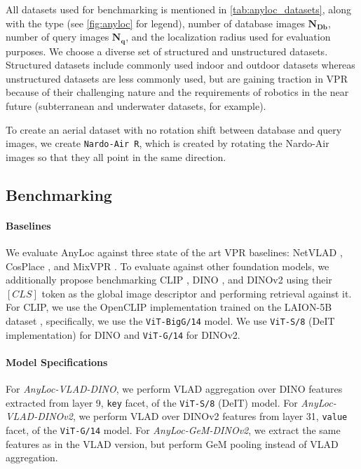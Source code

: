 All datasets used for benchmarking is mentioned in
\cref{tab:anyloc_datasets}, along with the type (see \cref{fig:anyloc}
for legend), number of database images $\mathbf{N_{Db}}$, number of
query images $\mathbf{N_q}$, and the localization radius used for
evaluation purposes. We choose a diverse set of structured and
unstructured datasets. Structured datasets include commonly used
indoor and outdoor datasets whereas unstructured datasets are less
commonly used, but are gaining traction in VPR because of their
challenging nature and the requirements of robotics in the near future
(subterranean and underwater datasets, for example).

To create an aerial dataset with no rotation shift between database 
and query images, we create \texttt{Nardo-Air R}, which is created by
rotating the Nardo-Air images so that they all point in the same 
direction.

\subsection{Benchmarking}

\paragraph{Baselines}

We evaluate AnyLoc against three state of the art VPR baselines:
NetVLAD \cite{Arandjelovi2015NetVLADCA}, CosPlace
\cite{Berton2022RethinkingVG}, and MixVPR \cite{Alibey2023MixVPRFM}.
To evaluate against other foundation models, we additionally propose
benchmarking CLIP \cite{Radford2021LearningTV}, DINO
\cite{Caron2021EmergingPI}, and DINOv2 \cite{Oquab2023DINOv2LR} using
their $\left[CLS\right]$ token as the global image descriptor and
performing retrieval against it. For CLIP, we use the OpenCLIP
implementation trained on the LAION-5B dataset
\cite{Ilharco2021OpenCLIP, Cherti2023ReproducibleSL,
Radford2021LearningTV, Schuhmann2022LAION5BAO}, specifically, we use
the \texttt{ViT-BigG/14} model. We use \texttt{ViT-S/8} (DeIT
implementation) for DINO and \texttt{ViT-G/14} for DINOv2.

\paragraph{Model Specifications}

For \emph{AnyLoc-VLAD-DINO}, we perform VLAD aggregation over DINO
features extracted from layer 9, \texttt{key} facet, of the
\texttt{ViT-S/8} (DeIT) model. For \emph{AnyLoc-VLAD-DINOv2}, we
perform VLAD over DINOv2 features from layer 31, \texttt{value} facet,
of the \texttt{ViT-G/14} model. For \emph{AnyLoc-GeM-DINOv2}, we
extract the same features as in the VLAD version, but perform GeM
pooling instead of VLAD aggregation.

